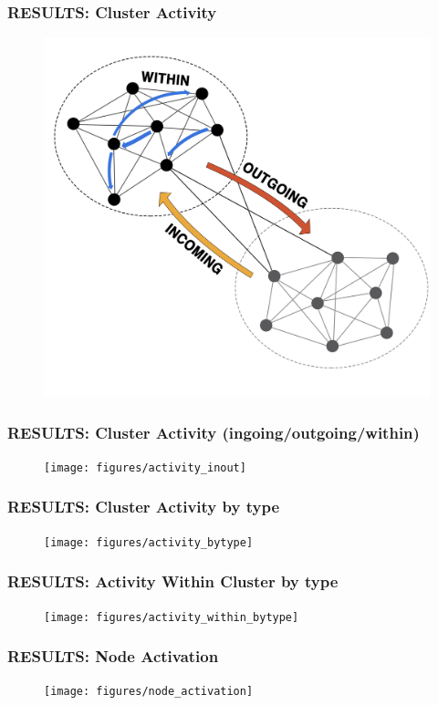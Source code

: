 \documentclass{beamer}
\begin{document}

\begin{frame}
\frametitle{RESULTS: Cluster Activity }
\begin{figure}
	\includegraphics[width=0.8\linewidth]{figures/activity}
\end{figure}
\end{frame}



\begin{frame}
\frametitle{RESULTS: Cluster Activity (ingoing/outgoing/within)}
\begin{figure}
	\texttt{[image: figures/activity\_inout]}
\end{figure}
\end{frame}


\begin{frame}
\frametitle{RESULTS: Cluster Activity by type}
\begin{figure}
	\texttt{[image: figures/activity\_bytype]}
\end{figure}
\end{frame}

\begin{frame}
\frametitle{RESULTS: Activity Within Cluster by type}
\begin{figure}
	\texttt{[image: figures/activity\_within\_bytype]}
\end{figure}
\end{frame}


\begin{frame}
\frametitle{RESULTS: Node Activation}
\begin{figure}
	\texttt{[image: figures/node\_activation]}
\end{figure}
\end{frame}














\end{document}
